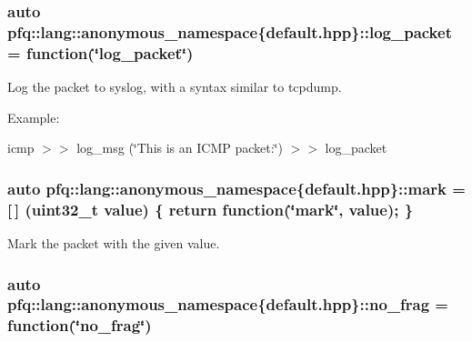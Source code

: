 \subsubsection[{\texorpdfstring{log\+\_\+packet}{log_packet}}]{\setlength{\rightskip}{0pt plus 5cm}auto pfq\+::lang\+::anonymous\+\_\+namespace\{default.\+hpp\}\+::log\+\_\+packet = {\bf function}(\char`\"{}log\+\_\+packet\char`\"{})}\hypertarget{namespacepfq_1_1lang_1_1anonymous__namespace_02default_8hpp_03_aed6076a98aece625738cbda3689183e2}{}\label{namespacepfq_1_1lang_1_1anonymous__namespace_02default_8hpp_03_aed6076a98aece625738cbda3689183e2}


Log the packet to syslog, with a syntax similar to tcpdump. 

Example\+:

icmp $>$$>$ log\+\_\+msg (\char`\"{}\+This is an I\+C\+M\+P packet\+:\char`\"{}) $>$$>$ log\+\_\+packet 
\subsubsection[{\texorpdfstring{mark}{mark}}]{\setlength{\rightskip}{0pt plus 5cm}auto pfq\+::lang\+::anonymous\+\_\+namespace\{default.\+hpp\}\+::mark = \mbox{[}$\,$\mbox{]} (uint32\+\_\+t value) \{ return {\bf function}(\char`\"{}mark\char`\"{}, value); \}}\hypertarget{namespacepfq_1_1lang_1_1anonymous__namespace_02default_8hpp_03_a7b831baeabda070b89ca862a9445a4a8}{}\label{namespacepfq_1_1lang_1_1anonymous__namespace_02default_8hpp_03_a7b831baeabda070b89ca862a9445a4a8}


Mark the packet with the given value. 

\subsubsection[{\texorpdfstring{no\+\_\+frag}{no_frag}}]{\setlength{\rightskip}{0pt plus 5cm}auto pfq\+::lang\+::anonymous\+\_\+namespace\{default.\+hpp\}\+::no\+\_\+frag = {\bf function}(\char`\"{}no\+\_\+frag\char`\"{})}\hypertarget{namespacepfq_1_1lang_1_1anonymous__namespace_02default_8hpp_03_a4cfaf018f687a1563161b8f4245a6652}{}\label{namespacepfq_1_1lang_1_1anonymous__namespace_02default_8hpp_03_a4cfaf018f687a1563161b8f4245a6652}


